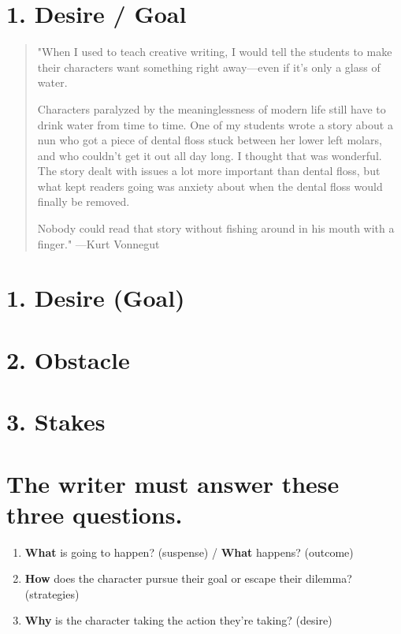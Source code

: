 \documentclass[12pt]{article}
\begin{document}
\section{1. Desire / Goal}
\label{sec:org332842d}
\begin{quote}
"When I used to teach creative writing, I would tell the students to make their characters want something right away---even if it's only a glass of water.

Characters paralyzed by the meaninglessness of modern life still have to drink water from time to time. One of my students wrote a story about a nun who got a piece of dental floss stuck between her lower left molars, and who couldn't get it out all day long. I thought that was wonderful. The story dealt with issues a lot more important than dental floss, but what kept readers going was anxiety about when the dental floss would finally be removed.

Nobody could read that story without fishing around in his mouth with a finger."
---Kurt Vonnegut
\end{quote}

\section{1. Desire (Goal)}
\label{sec:orga72f36c}


\section{2. Obstacle}
\label{sec:org785a041}

\section{3. Stakes}
\label{sec:org5c7e4a7}

\section{The writer \textbf{must} answer these \textbf{three questions}.}
\label{sec:org04c6a34}
\begin{enumerate}
\item \textbf{What} is going to happen? (suspense) / \textbf{What} happens? (outcome)
\item \textbf{How} does the character pursue their goal or escape their dilemma? (strategies)
\item \textbf{Why} is the character taking the action they're taking? (desire)
\end{enumerate}
\end{document}
